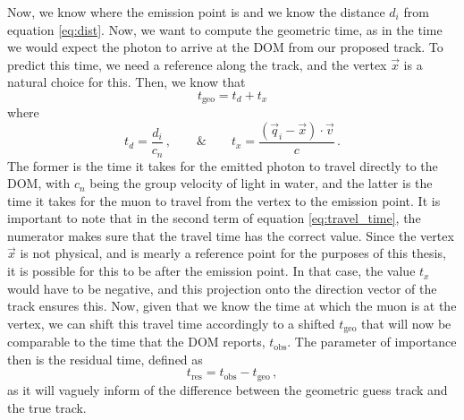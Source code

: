 Now, we know where the emission point is and we know the distance $d_{i}$ from equation \ref{eq:dist}. Now, we want to compute the geometric time, as in the time we would expect the photon to arrive at the DOM from our proposed track. To predict this time, we need a reference along the track, and the vertex $\vec{x}$ is a natural choice for this. Then, we know that
\begin{equation}
  t_{\text{geo}} = t_{d} + t_{x}
\end{equation}
where
\begin{equation}\label{eq:travel_time}
  t_{d} = \frac{d_{i}}{c_{n}}\, , \hspace{2em} \& \hspace{2em} t_{x} = \frac{(\vec{q}_{i} - \vec{x})\cdot\vec{v}}{c}\, .
\end{equation}
The former is the time it takes for the emitted photon to travel directly to the DOM, with $c_{n}$ being the group velocity of light in water, and the latter is the time it takes for the muon to travel from the vertex to the emission point. It is important to note that in the second term of equation \ref{eq:travel_time}, the numerator makes sure that the travel time has the correct value. Since the vertex $\vec{x}$ is not physical, and is mearly a reference point for the purposes of this thesis, it is possible for this to be after the emission point. In that case, the value $t_{x}$ would have to be negative, and this projection onto the direction vector of the track ensures this. Now, given that we know the time at which the muon is at the vertex, we can shift this travel time accordingly to a shifted $t_{\text{geo}}$ that will now be comparable to the time that the DOM reports, $t_{\text{obs}}$. The parameter of importance then is the residual time, defined as
\begin{equation}
  t_{\text{res}} = t_{\text{obs}} - t_{\text{geo}}\, ,
\end{equation}
as it will vaguely inform of the difference between the geometric guess track and the true track. 

